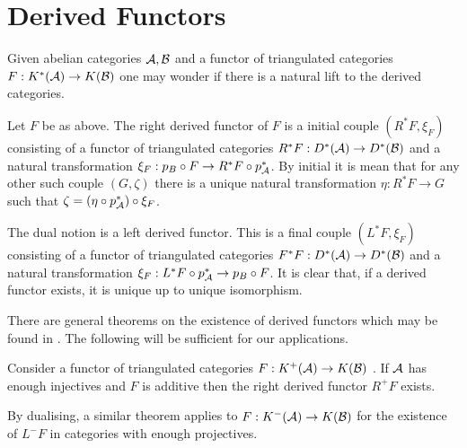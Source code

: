 \section{Derived Functors}
Given abelian categories $\AA, \mathcal{B}$ and a functor of triangulated categories $F:K^*(\AA)\to K(\mathcal{B})$ one may wonder if there is a natural lift to the derived categories.
\begin{definition}
 Let $F$ be as above. The right derived functor of $F$ is a initial couple $(R^*F,\xi_F)$ consisting of a functor of triangulated categories $R^*F:D^*(\AA) \to D^*(\mathcal{B})$ and a natural transformation $\xi_F:p_B\circ F \to R^*F \circ p_\AA^*$.
 By initial it is mean that for any other such couple $(G,\zeta)$ there is a unique natural transformation $\eta: R^*F\to G$ such that $\zeta = (\eta \circ p_\AA^*)\circ \xi_{F}$.
\end{definition}
The dual notion is a left derived functor. This is a final couple $(L^*F,\xi_F)$ consisting of a functor of triangulated categories $F^*F:D^*(\AA) \to D^*(\mathcal{B})$ and a natural transformation $\xi_F:  L^*F \circ p_\AA^* \to p_B\circ F$.
It is clear that, if a derived functor exists, it is unique up to unique isomorphism.

There are general theorems on the existence of derived functors which may be found in \cite[Chapter 1]{dimca2004sheaves}.
The following will be sufficient for our applications.
\begin{theorem}\label{thm: InjectivesAllowDerivedFunctor}
 Consider a functor of triangulated categories $F:K^+(\AA)\to K(\mathcal{B})$ .
 If $\AA$ has enough injectives and $F$ is additive then the right derived functor $R^+F$ exists.
\end{theorem}
By dualising, a similar theorem applies to $F:K^-(\AA)\to K(\mathcal{B})$ for the existence of $L^- F$ in categories with enough projectives.

